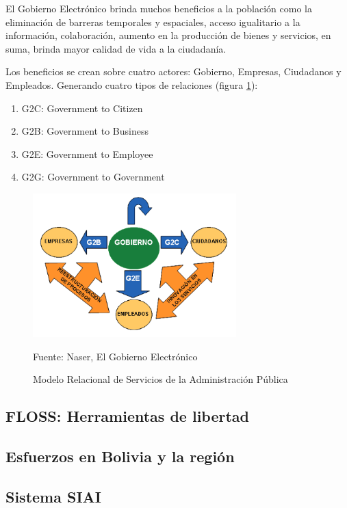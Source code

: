 El Gobierno Electrónico brinda muchos beneficios a la población como la eliminación de barreras temporales y espaciales, acceso igualitario a la información, colaboración, aumento en la producción de bienes y servicios, en suma, brinda mayor calidad de vida a la ciudadanía.

Los beneficios se crean sobre cuatro actores: Gobierno, Empresas, Ciudadanos y Empleados. Generando cuatro tipos de relaciones (figura \ref{fig:g2all}):

\begin{enumerate}
    \item G2C: Government to Citizen
    \item G2B: Government to Business
    \item G2E: Government to Employee
    \item G2G: Government to Government
\end{enumerate}

\begin{figure}[!htpb]
    \centering
    \includegraphics[width=0.7\textwidth]{assets/g2all}
    \caption{Modelo Relacional de Servicios de la Administración Pública}{Fuente: Naser, El Gobierno Electrónico}
    \label{fig:g2all}
\end{figure}

\subsection{FLOSS: Herramientas de libertad}

\subsection{Esfuerzos en Bolivia y la región}

\subsection{Sistema SIAI}

